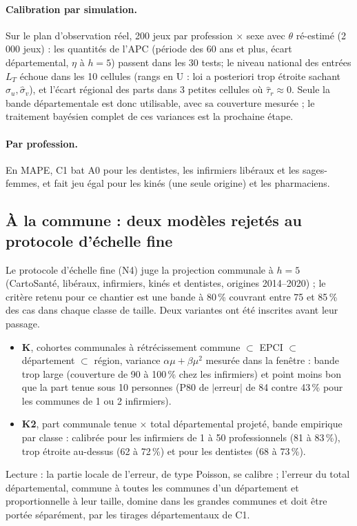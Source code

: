 \paragraph{Calibration par simulation.} Sur le plan d'observation réel, 200 jeux par profession
$\times$ sexe avec $\theta$ ré-estimé (2\,000 jeux) : les quantités de l'APC (période des 60 ans et
plus, écart départemental, $\eta$ à $h=5$) passent dans les 30 tests\mesure ; le niveau national des
entrées $L_T$ échoue dans les 10 cellules\mesure{} (rangs en U : loi a posteriori trop étroite
sachant $\hat\sigma_u, \hat\sigma_v$), et l'écart régional des parts dans 3 petites cellules\mesure{}
où $\hat\tau_r \approx 0$. Seule la bande départementale est donc utilisable, avec sa couverture
mesurée ; le traitement bayésien complet de ces variances est la prochaine étape.

\paragraph{Par profession.} En MAPE, C1 bat A0 pour les dentistes, les infirmiers libéraux et les
sages-femmes, et fait jeu égal pour les kinés (une seule origine) et les pharmaciens\mesure.

\subsection{À la commune : deux modèles rejetés au protocole d'échelle fine}
Le protocole d'échelle fine (N4) juge la projection communale à $h = 5$ (CartoSanté, libéraux,
infirmiers, kinés et dentistes, origines 2014--2020) ; le critère retenu pour ce chantier est une bande
à 80\,\% couvrant entre 75 et 85\,\% des cas dans chaque classe de taille. Deux variantes ont été
inscrites avant leur passage.
\begin{itemize}
  \item \textbf{K}, cohortes communales à rétrécissement commune $\subset$ EPCI $\subset$ département
        $\subset$ région, variance $\alpha\mu + \beta\mu^2$ mesurée dans la fenêtre : bande trop large
        (couverture de 90 à 100\,\%\mesure{} chez les infirmiers) et point moins bon que la part tenue
        sous 10 personnes (P80 de $|$erreur$|$ de 84 contre 43\,\%\mesure{} pour les communes de 1 ou
        2 infirmiers).
  \item \textbf{K2}, part communale tenue $\times$ total départemental projeté, bande empirique par
        classe : calibrée pour les infirmiers de 1 à 50 professionnels (81 à 83\,\%\mesure), trop
        étroite au-dessus (62 à 72\,\%\mesure) et pour les dentistes (68 à 73\,\%\mesure).
\end{itemize}
Lecture\derive{} : la partie locale de l'erreur, de type Poisson, se calibre ; l'erreur du total
départemental, commune à toutes les communes d'un département et proportionnelle à leur taille, domine
dans les grandes communes et doit être portée séparément, par les tirages départementaux de C1.

